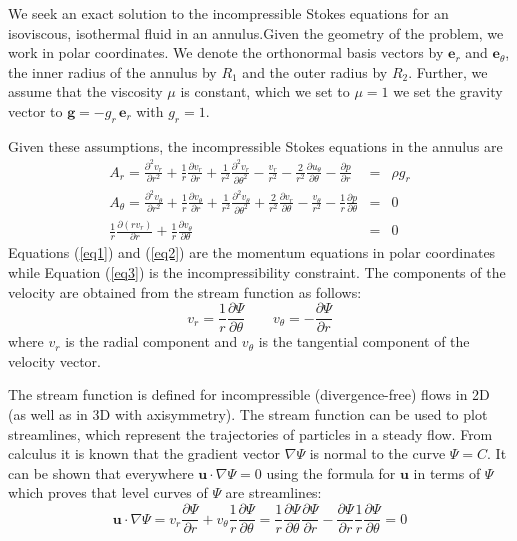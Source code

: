 


We seek an exact solution to the incompressible Stokes equations for an isoviscous, isothermal fluid in an  annulus.Given the geometry of the problem, we work in polar coordinates.
We denote the orthonormal basis vectors by $\mathbf{ e}_r$ and $\mathbf{ e}_\theta$, the inner radius of the annulus by $R_1$ and the outer radius by $R_2$.
Further, we assume that the viscosity $\mu$ is constant, which we set to $\mu = 1$ we set the gravity vector to $\mathbf{g} = -g_r \, \mathbf{e}_r$ with $g_r = 1$. 

Given these assumptions, the incompressible Stokes equations in the annulus are~\cite{scto01}
\begin{eqnarray}
A_r =     \frac{\partial^2 v_r}{\partial r^2} + \frac{1}{r} \frac{\partial v_r}{\partial r} +   
      \frac{1}{r^2} \frac{\partial^2 v_r}{\partial \theta^2}
    - \frac{v_r}{r^2} - \frac{2}{r^2} \frac{\partial u_\theta}{\partial \theta} 
-\frac{\partial p}{\partial r}  &=& \rho g_r \label{eq1} \\
A_\theta=
\frac{\partial^2 v_\theta}{\partial r^2} + \frac{1}{r} \frac{\partial v_\theta}{\partial r} + \frac{1}{r^2} \frac{\partial^2 v_\theta}{\partial \theta^2}
+\frac{2}{r^2} \frac{\partial v_r}{\partial \theta} - \frac{v_\theta}{r^2} 
-\frac{1}{r}\frac{\partial p}{\partial \theta} &=& 0
\label{eq2} \\
\frac{1}{r} \frac{\partial (rv_r)}{\partial r} + \frac{1}{r} \frac{\partial v_\theta}{\partial \theta} &=&0 \label{eq3}
\end{eqnarray}
Equations (\ref{eq1}) and (\ref{eq2}) are the momentum equations in polar coordinates while
Equation (\ref{eq3}) is the incompressibility constraint. 
The components of the velocity are obtained from the stream function as follows:
\[
v_r = \frac{1}{r}\frac{\partial \Psi}{\partial \theta}
\quad\quad
v_\theta = - \frac{\partial \Psi}{\partial r}
\]
where $v_r$ is the radial component and $v_\theta$ is the tangential component of the velocity vector.

The stream function is defined for incompressible (divergence-free) 
flows in 2D (as well as in 3D with axisymmetry).
The stream function can be used to plot streamlines, 
which represent the trajectories of particles in a steady flow.
From calculus it is known that the gradient vector $\nabla \Psi$
is normal to the curve $\Psi =C$. 
It can be shown that everywhere ${\boldsymbol {u}}\cdot \nabla \Psi =0$ 
using the formula for $\boldsymbol{u}$ in terms of 
$\Psi$ which proves that level curves of $\Psi$ are streamlines:
\[
{\bm u}\cdot \nabla \Psi 
= v_r \frac{\partial \Psi}{\partial r} + v_\theta \frac{1}{r} \frac{\partial \Psi}{\partial \theta} 
= \frac{1}{r}\frac{\partial \Psi}{\partial \theta} \frac{\partial \Psi}{\partial r} 
- \frac{\partial \Psi}{\partial r} \frac{1}{r} \frac{\partial \Psi}{\partial \theta} 
=0
\] 





